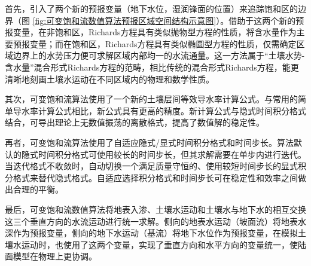 首先，引入了两个新的预报变量（地下水位，湿润锋面的位置）来追踪饱和区的边界（图 \ref{fig:可变饱和流数值算法预报区域空间结构示意图}）。借助于这两个新的预报变量，在非饱和区，Richards方程具有类似抛物型方程的性质，将含水量作为主要预报变量；而在饱和区，Richards方程具有类似椭圆型方程的性质，仅需确定区域边界上的水势压力便可求解区域内部均一的水流通量。这一方法属于“土壤水势-含水量”混合形式Richards方程的范畴，相比传统的混合形式Richards方程，能更清晰地刻画土壤水运动在不同区域内的物理和数学性质。

其次，可变饱和流算法使用了一个新的土壤层间等效导水率计算公式。与常用的简单导水率计算公式相比，新公式具有更高的精度。新计算公式与隐式时间积分格式结合，可导出理论上无数值振荡的离散格式，提高了数值解的稳定性。

再者，可变饱和流算法使用了自适应隐式/显式时间积分格式和时间步长。算法默认的隐式时间积分格式可使用较长的时间步长，但其求解需要在单步内进行迭代。当迭代格式不收敛时，自动切换一个满足质量守恒的、使用较短时间步长的显式积分格式来替代隐式格式。自适应选择积分格式和时间步长可在稳定性和效率之间做出合理的平衡。

最后，可变饱和流数值算法将地表入渗、土壤水运动和土壤水与地下水的相互交换这三个垂直方向的水流运动进行统一求解。侧向的地表水运动（坡面流）将地表水深作为预报变量，侧向的地下水运动（基流）将地下水位作为预报变量，在模拟土壤水运动时，也使用了这两个变量，实现了垂直方向和水平方向的变量统一，使陆面模型在物理上更协调。


